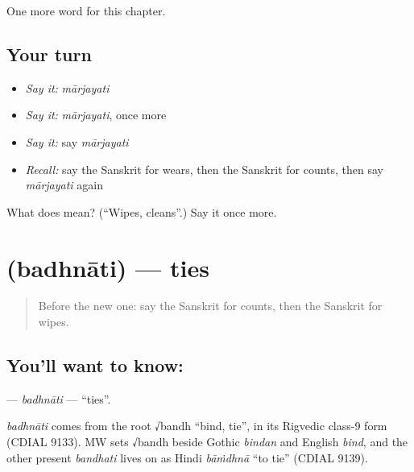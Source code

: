 \begin{grammarlens}[title={What you've built}]
One more word for this chapter.
\end{grammarlens}

\subsection*{Your turn}
\begin{itemize}
\raggedright
  \item \emph{Say it:} \emph{mārjayati}
  \item \emph{Say it:} \emph{mārjayati}, once more
  \item \emph{Say it:} say \emph{mārjayati}
  \item \emph{Recall:} say the Sanskrit for wears, then the Sanskrit for counts, then say \emph{mārjayati} again
\end{itemize}

\begin{tcolorbox}[breakable,colback=teal!4,colframe=teal!35!black,title={Before you move on}]
What does  mean? (\textquotedblleft{}Wipes, cleans\textquotedblright{}.) Say it once more.
\end{tcolorbox}
\section[\texorpdfstring{\sk{बध्नाति} (badhnāti)}{बध्नाति (badhnāti)}]{ (badhnāti) — ties}

\label{lesson:SA-C136-badhnati}



\begin{quote}
Before the new one: say the Sanskrit for counts, then the Sanskrit for wipes.
\end{quote}

\subsection*{You'll want to know: }
\textbf{} — \emph{badhnāti} — \textquotedblleft{}ties\textquotedblright{}.

\begin{cousinweb}
\emph{badhnāti} comes from the root √bandh \textquotedblleft{}bind, tie\textquotedblright{}, in its Rigvedic class-9 form (CDIAL 9133). MW sets √bandh beside Gothic \emph{bindan} and English \emph{bind}, and the other present \emph{bandhati} lives on as Hindi \emph{bāṁdhnā} \textquotedblleft{}to tie\textquotedblright{} (CDIAL 9139).
\end{cousinweb}

